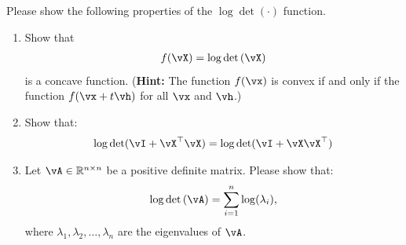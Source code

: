 \documentclass[../../book-main.tex]{subfiles}
\begin{document}
\begin{exercise}
	Please show the following properties of the  $\log\det(\cdot)$ function.
	\begin{enumerate}
		\item Show that
		      \begin{align*}
			      f(\vX) = \log\det\left(\vX\right)
		      \end{align*}
		      is a concave function. ({\bf Hint:} The function $f(\vx)$ is convex if and only if the function $f(\vx+t\vh)$ for all $\vx$ and $\vh$.)

		\item Show that:
		      \begin{align*}
			      \log\det(\vI + \vX^\top\vX) = \log\det(\vI + \vX\vX^\top)
		      \end{align*}

		\item Let $\vA \in \R^{n\times n}$ be a positive definite matrix. Please show that:
		      \begin{align}
			      \log\det\left(\vA \right) = \sum_{i=1}^n \log(\lambda_i),
		      \end{align}
		      where $\lambda_1,\lambda_2,\dots,\lambda_n$ are the eigenvalues of $\vA$.
	\end{enumerate}

\end{exercise}


 
\end{document}
